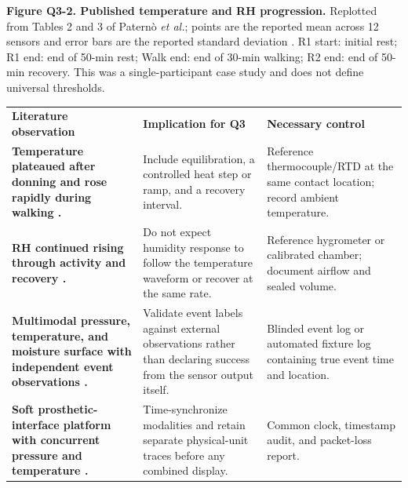 \vspace{0.25em}
{\fontsize{8.2}{9.55}\selectfont\color{AUBGray}
\textbf{Figure Q3-2. Published temperature and RH progression.} Replotted from
Tables 2 and 3 of Patern\`o \textit{et al.}; points are the reported mean across
12 sensors and error bars are the reported standard deviation
\cite{paterno2020}. R1 start: initial rest; R1 end: end of 50-min rest;
Walk end: end of 30-min walking; R2 end: end of 50-min recovery. This was a
single-participant case study and does not define universal thresholds.\par}

\vspace{0.55em}
\begingroup
\fontsize{8.7}{10.3}\selectfont
\renewcommand{\arraystretch}{1.12}
\begin{tabularx}{\linewidth}{>{\raggedright\arraybackslash\bfseries\color{AUBRed}}p{3.0cm}Y Y}
\color{white}\textbf{Literature observation} &
\color{white}\textbf{Implication for Q3} &
\color{white}\textbf{Necessary control} \\
Temperature plateaued after donning and rose rapidly during walking
\cite{paterno2020}. & Include equilibration, a controlled heat step or ramp,
and a recovery interval. & Reference thermocouple/RTD at the same contact
location; record ambient temperature. \\
RH continued rising through activity and recovery \cite{paterno2020}. & Do not
expect humidity response to follow the temperature waveform or recover at the
same rate. & Reference hygrometer or calibrated chamber; document airflow and
sealed volume. \\
Multimodal pressure, temperature, and moisture surface with independent event observations
\cite{q3woo2022}. & Validate event labels against external observations rather
than declaring success from the sensor output itself. & Blinded event log or
automated fixture log containing true event time and location. \\
Soft prosthetic-interface platform with concurrent pressure and temperature
\cite{q3kwak2020}. & Time-synchronize modalities and
retain separate physical-unit traces before any combined display. & Common
clock, timestamp audit, and packet-loss report. \\
\end{tabularx}
\endgroup
{}

